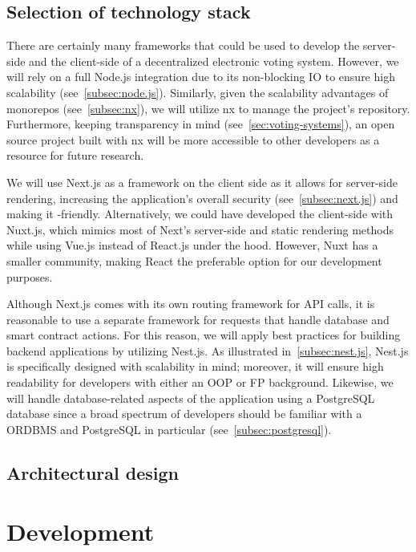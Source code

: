 \subsection{Selection of technology stack}\label{subsec:selection-of-tech-stack}

There are certainly many frameworks that could be used to develop the server-side and the client-side of a decentralized electronic voting system.
However, we will rely on a full Node.js integration due to its non-blocking \gls{IO} to ensure high scalability (see~\cref{subsec:node.js}).
Similarly, given the scalability advantages of monorepos (see~\cref{subsec:nx}), we will utilize nx to manage the project's repository.
Furthermore, keeping transparency in mind (see~\cref{sec:voting-systems}), an open source project built with nx will be more accessible to other developers as a resource for future research.

We will use Next.js as a framework on the client side as it allows for server-side rendering, increasing the application's overall security (see~\cref{subsec:next.js}) and making it -friendly.
Alternatively, we could have developed the client-side with Nuxt.js, which mimics most of Next's server-side and static rendering methods while using Vue.js instead of React.js under the hood.
However, Nuxt has a smaller community, making React the preferable option for our development purposes.

Although Next.js comes with its own routing framework for API calls, it is reasonable to use a separate framework for requests that handle database and smart contract actions.
For this reason, we will apply best practices for building backend applications by utilizing Nest.js.
As illustrated in~\cref{subsec:nest.js}, Nest.js is specifically designed with scalability in mind;
moreover, it will ensure high readability for developers with either an \gls{OOP} or \gls{FP} background.
Likewise, we will handle database-related aspects of the application using a PostgreSQL database since a broad spectrum of developers should be familiar with a \gls{ORDBMS} and PostgreSQL in particular (see~\cref{subsec:postgresql}).

\subsection{Architectural design}\label{subsec:architectural-design}


\section{Development}\label{sec:development}

